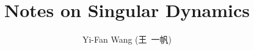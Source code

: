 \documentclass[a4paper,10pt]{article}
\title{Notes on Singular Dynamics}
\author{Yi-Fan Wang (王\ 一帆)}
\begin{document}
\maketitle

\section{}

\printbibliography
\end{document}
